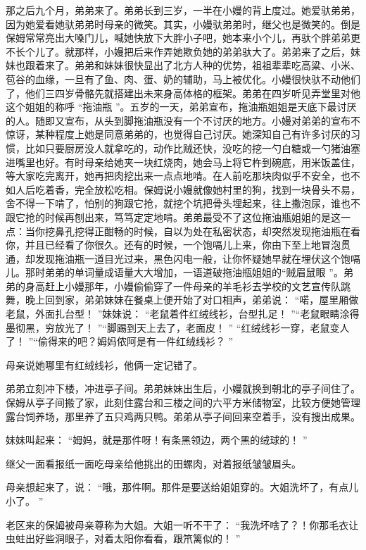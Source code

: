 \documentclass[12pt,twoside,openany]{book}
\begin{document}
那之后九个月，弟弟来了。弟弟长到三岁，一半在小嫚的背上度过。她爱驮弟弟，因为她爱看她驮弟弟时母亲的微笑。其实，小嫚驮弟弟时，继父也是微笑的。倒是保姆常常亮出大嗓门儿，喊她快放下大胖小子吧，她本来小个儿，再驮个胖弟弟更不长个儿了。就那样，小嫚把后来作弄她欺负她的弟弟驮大了。弟弟来了之后，妹妹也跟着来了。弟弟和妹妹很快显出了北方人种的优势，祖祖辈辈吃高粱、小米、苞谷的血缘，一旦有了鱼、肉、蛋、奶的辅助，马上被优化。小嫚很快驮不动他们了，他们三四岁骨骼先就搭建出未来身高体格的框架。弟弟在四岁听见弄堂里对他这个姐姐的称呼 “拖油瓶 ”。五岁的一天，弟弟宣布，拖油瓶姐姐是天底下最讨厌的人。随即又宣布，从头到脚拖油瓶没有一个不讨厌的地方。小嫚对弟弟的宣布不惊讶，某种程度上她是同意弟弟的，也觉得自己讨厌。她深知自己有许多讨厌的习惯，比如只要厨房没人就拿吃的，动作比贼还快，没吃的挖一勺白糖或一勺猪油塞进嘴里也好。有时母亲给她夹一块红烧肉，她会马上将它杵到碗底，用米饭盖住，等大家吃完离开，她再把肉挖出来一点点地啃。在人前吃那块肉似乎不安全，也不如人后吃着香，完全放松吃相。保姆说小嫚就像她村里的狗，找到一块骨头不易，舍不得一下啃了，怕别的狗跟它抢，就挖个坑把骨头埋起来，往上撒泡尿，谁也不跟它抢的时候再刨出来，笃笃定定地啃。弟弟最受不了这位拖油瓶姐姐的是这一点：当你挖鼻孔挖得正酣畅的时候，自以为处在私密状态，却突然发现拖油瓶在看你，并且已经看了你很久。还有的时候，一个饱嗝儿上来，你由下至上地冒泡贯通，却发现拖油瓶一道目光过来，黑色闪电一般，让你怀疑她早就在埋伏这个饱嗝儿。那时弟弟的单词量成语量大大增加，一语道破拖油瓶姐姐的“贼眉鼠眼 ”。弟弟的身高赶上小嫚那年，小嫚偷偷穿了一件母亲的羊毛衫去学校的文艺宣传队跳舞，晚上回到家，弟弟妹妹在餐桌上便开始了对口相声，弟弟说： “喏，屋里厢做老鼠，外面扎台型！ ”妹妹说： “老鼠着件红绒线衫，台型扎足！ ”“老鼠眼睛涂得墨彻黑，穷放光了！ ”“脚踢到天上去了，老面皮！ ” “红绒线衫一穿，老鼠变人了！ ”“偷得来的吧？姆妈侬阿是有一件红绒线衫？ ”

母亲说她哪里有红绒线衫，他俩一定记错了。

弟弟立刻冲下楼，冲进亭子间。弟弟妹妹出生后，小嫚就换到朝北的亭子间住了。保姆从亭子间搬了家，此刻住露台和三楼之间的六平方米储物室，比较方便她管理露台饲养场，那里养了五只鸡两只鸭。弟弟从亭子间回来空着手，没有搜出成果。

妹妹叫起来： “姆妈，就是那件呀！有条黑领边，两个黑的绒球的！ ”

继父一面看报纸一面吃母亲给他挑出的田螺肉，对着报纸皱皱眉头。

母亲想起来了，说： “哦，那件啊。那件是要送给姐姐穿的。大姐洗坏了，有点儿小了。 ”

老区来的保姆被母亲尊称为大姐。大姐一听不干了： “我洗坏啥了？！你那毛衣让虫蛀出好些洞眼子，对着太阳你看看，跟笊篱似的！ ”
\end{document}
